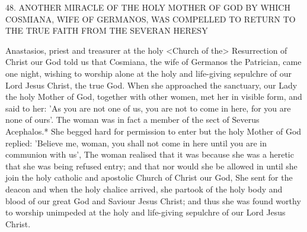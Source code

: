 48.
ANOTHER MIRACLE OF THE HOLY MOTHER
OF GOD BY WHICH COSMIANA,
WIFE OF GERMANOS, WAS COMPELLED
TO RETURN TO THE TRUE FAITH
FROM THE SEVERAN HERESY

Anastasios, priest and treasurer at the holy <Church of the>
Resurrection of Christ our God told us that Cosmiana, the wife of
Germanos the Patrician, came one night, wishing to worship alone
at the holy and life-giving sepulchre of our Lord Jesus Christ, the
true God.
When she approached the sanctuary, our Lady the holy
Mother of God, together with other women, met her in visible form,
and said to her: 'As you are not one of us, you are not to come in
here, for you are none of ours'.
The woman was in fact a member
of the sect of Severus Acephalos.* She begged hard for permission
to enter but the holy Mother of God replied: 'Believe me, woman,
you shall not come in here until you are in communion with us',
The woman realised that it was because she was a heretic that she
was being refused entry; and that nor would she be allowed in until
she join the holy catholic and apostolic Church of Christ our God,
She sent for the deacon and when the holy chalice arrived, she
partook of the holy body and blood of our great God and Saviour
Jesus Christ; and thus she was found worthy to worship unimpeded
at the holy and life-giving sepulchre of our Lord Jesus Christ.

